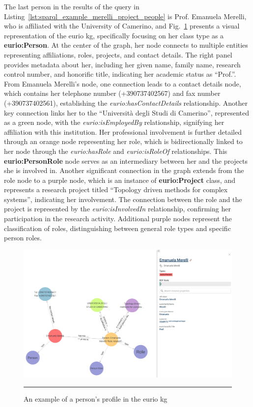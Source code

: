 The last person in the results of the query in Listing~\ref{lst:sparql_example_merelli_project_people} is Prof. Emanuela Merelli, who is affiliated with the University of Camerino, and Fig.~\ref{fig:example-person-prof-merelli} presents a visual representation of the \gls{eurio} \gls{kg}, specifically focusing on her class type as a \textbf{eurio:Person}.
At the center of the graph, her node connects to multiple entities representing affiliations, roles, projects, and contact details.
The right panel provides metadata about her, including her given name, family name, research control number, and honorific title, indicating her academic status as ``Prof.''.
From Emanuela Merelli's node, one connection leads to a contact details node, which contains her telephone number (+390737402567) and fax number (+390737402561), establishing the \textit{eurio:hasContactDetails} relationship.
Another key connection links her to the ``Universit\`a degli Studi di Camerino'', represented as a green node, with the \textit{eurio:isEmployedBy} relationship, signifying her affiliation with this institution.
Her professional involvement is further detailed through an orange node representing her role, which is bidirectionally linked to her node through the \textit{eurio:hasRole} and \textit{eurio:isRoleOf} relationships.
This \textbf{eurio:PersonRole} node serves as an intermediary between her and the projects she is involved in.
Another significant connection in the graph extends from the role node to a purple node, which is an instance of \textbf{eurio:Project} class, and represents a research project titled ``Topology driven methods for complex systems'', indicating her involvement.
The connection between the role and the project is represented by the \textit{eurio:isInvolvedIn} relationship, confirming her participation in the research activity.
Additional purple nodes represent the classification of roles, distinguishing between general role types and specific person roles.

\begin{figure}[htbp]
    \centering
 \includegraphics[width=.9\textwidth]{figures/architecture/example-person-prof-merelli.png}
     \rule{35em}{0.5pt}
    \caption{An example of a person's profile in the \gls{eurio} \gls{kg}}
 \label{fig:example-person-prof-merelli}
\end{figure}

